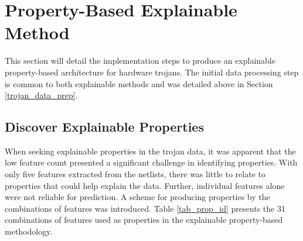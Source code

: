 

\section{Property-Based Explainable Method} \label{prop_explainable_arch}

This section will detail the implementation steps to produce an explainable
property-based architecture for hardware trojans.  The initial data processing
step is common to both explainable methods and was detailed above in Section
\ref{trojan_data_prep}.

\subsection{Discover Explainable Properties}

When seeking explainable properties  in the trojan data, it was apparent that
the low feature count presented a significant challenge in identifying
properties. With only five features extracted from the netlists, there was
little to relate to properties that could help explain the data. Further,
individual features alone were not reliable for prediction.  A scheme for
producing properties by the combinations of features was introduced. Table
\ref{tab_prop_id} presents the 31 combinations of features used as properties
in the explainable property-based methodology.

